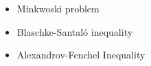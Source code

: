 \begin{itemize}
\item Minkwoski problem
\item Blaschke-Santal\'o inequality
\item Alexandrov-Fenchel Inequality
\end{itemize}